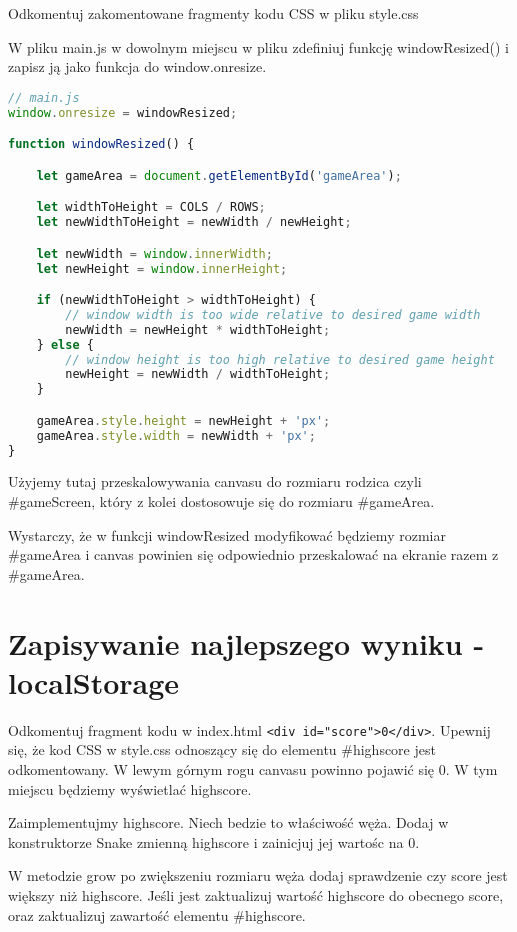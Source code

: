 \documentclass[12pt]{article}
\begin{document}
Odkomentuj zakomentowane fragmenty kodu CSS w pliku style.css

W pliku main.js w dowolnym miejscu w pliku zdefiniuj funkcję windowResized() i zapisz ją jako funkcja do window.onresize.

\begin{lstlisting}[language=JavaScript]
// main.js
window.onresize = windowResized;

function windowResized() {

    let gameArea = document.getElementById('gameArea');

    let widthToHeight = COLS / ROWS;
    let newWidthToHeight = newWidth / newHeight;

    let newWidth = window.innerWidth;
    let newHeight = window.innerHeight;

    if (newWidthToHeight > widthToHeight) {
        // window width is too wide relative to desired game width
        newWidth = newHeight * widthToHeight;
    } else {
        // window height is too high relative to desired game height
        newHeight = newWidth / widthToHeight;
    }

    gameArea.style.height = newHeight + 'px';
    gameArea.style.width = newWidth + 'px';
}
\end{lstlisting}

Użyjemy tutaj przeskalowywania canvasu do rozmiaru rodzica czyli #gameScreen, który z kolei dostosowuje się do rozmiaru #gameArea.

Wystarczy, że w funkcji windowResized modyfikować będziemy rozmiar #gameArea i canvas powinien się odpowiednio przeskalować na ekranie razem z #gameArea.

\section{Zapisywanie najlepszego wyniku - localStorage}

Odkomentuj fragment kodu w index.html \texttt{<div id="score">0</div>}. Upewnij się, że kod CSS w style.css odnoszący się do elementu #highscore jest odkomentowany. W lewym górnym rogu canvasu powinno pojawić się 0. W tym miejscu będziemy wyświetlać highscore.

Zaimplementujmy highscore. Niech bedzie to właściwość węża. Dodaj w konstruktorze Snake zmienną highscore i zainicjuj jej wartośc na 0.

W metodzie grow po zwiększeniu rozmiaru węża dodaj sprawdzenie czy score jest większy niż highscore. Jeśli jest zaktualizuj wartość highscore do obecnego score, oraz zaktualizuj zawartość elementu #highscore.
\end{document}
